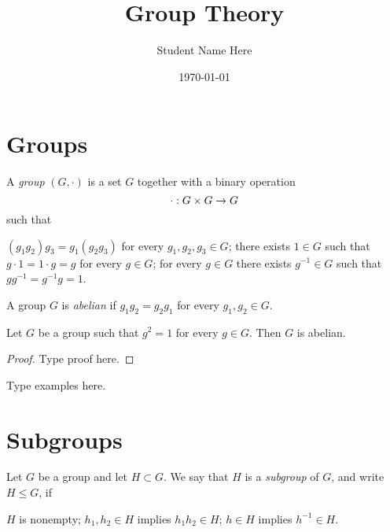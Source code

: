 \documentclass{amsart}
\begin{document}
\title{Group Theory}
\author{Student Name Here}
\address{Department of Mathematics and CSci\\
         Southern Arkansas University}
\date{\today}

\maketitle

\section{Groups}

\begin{Def}
A {\em group} $(G,\cdot)$ is a set $G$ together with a binary operation
\[ \cdot : G \times G \to G \]
such that
\begin{itemize}
 $(g_1 g_2) g_3 = g_1(g_2 g_3)$ for every $g_1,g_2,g_3 \in G$;
 there exists $1 \in G$ such that $g \cdot 1 = 1 \cdot g = g$ for every $g \in G$;
 for every $g \in G$ there exists $g^{-1} \in G$ such that $g g^{-1} = g^{-1} g = 1$.
\end{itemize}
\end{Def}

\begin{Def}
A group $G$ is {\em abelian} if $g_1 g_2 = g_2 g_1$ for every $g_1,g_2 \in G$.
\end{Def}

\begin{Prop}
Let $G$ be a group such that $g^2 = 1$ for every $g \in G$.
Then $G$ is abelian.
\end{Prop}

\begin{proof}
Type proof here.
\end{proof}

Type examples here.

\newpage %

\section{Subgroups}

\begin{Def}
Let $G$ be a group and let $H \subset G$.  We say that $H$ is a {\em subgroup} of $G$,
and write $H \le G$, if
\begin{itemize}
 $H$ is nonempty;
 $h_1,h_2 \in H$ implies $h_1 h_2 \in H$;
 $h \in H$ implies $h^{-1} \in H$.
\end{itemize}
\end{Def}
\end{document}
